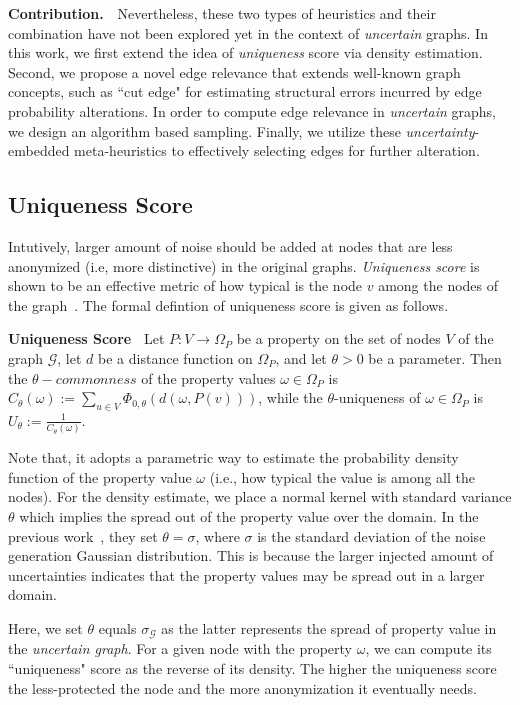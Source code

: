 \textbf{Contribution.}~~Nevertheless, these two types of heuristics and their combination have not been explored yet in the context of \emph{uncertain} graphs.
In this work, we first extend the idea of \emph{uniqueness} score via density estimation. Second, we propose a novel edge relevance that extends well-known graph concepts, such as ``cut edge" for estimating structural errors incurred by edge probability alterations. In order to compute edge relevance in \emph{uncertain} graphs, we design an algorithm based sampling. Finally, we utilize these \emph{uncertainty}-embedded meta-heuristics to effectively selecting edges for further alteration. 

\subsection{Uniqueness Score}
Intutively, larger amount of noise should be added at nodes that are less anonymized (i.e, more distinctive) in the original graphs. \emph{Uniqueness score} is shown to be an effective metric of how typical is the node $v$ among the nodes of the graph~\cite{Boldi_Injecting_2012}. The formal defintion of uniqueness score is given as follows. 
\begin{definition}
    \textbf{Uniqueness Score~\cite{Boldi_Injecting_2012}}
     Let $P:V \rightarrow  \Omega_{P}$ be a property on the set of nodes $V$ of the graph $\mathcal{G}$, let $d$ be a distance function on $\Omega_{P}$, and let $\theta >0$  be a parameter. 
  Then the $\theta-commonness$ of the property values $\omega \in \Omega_{P}$ is $C_{\theta}(\omega):= \sum_{u \in V} \Phi_{0,\theta}(d(\omega, P(v)))$,   
while the $\theta$-uniqueness of $\omega \in \Omega_{P}$ is $U_{\theta}:= \frac{1}{C_{\theta}(\omega)}$. 
\end{definition} 

Note that, it adopts a parametric way to estimate the probability density function of the property value $\omega$ (i.e., how typical the value is among all the nodes). For the density estimate, we place a normal kernel with standard variance 
$\theta$ which implies the spread out of the property value over the domain. In the previous work~\cite{Boldi_Injecting_2012}, they set $\theta=\sigma$, where $\sigma$ is the standard deviation of the noise generation Gaussian distribution. This is because the larger injected amount of uncertainties indicates that the property values may be spread out in a larger domain. 

Here, we set $\theta$ equals $\sigma_{\mathcal{G}}$ as the latter represents the spread of property value in the \emph{uncertain graph}. For a given node with the property $\omega$, we can compute its ``uniqueness" score as the reverse of its density. The higher the uniqueness score the less-protected the node and the more anonymization it eventually needs.






